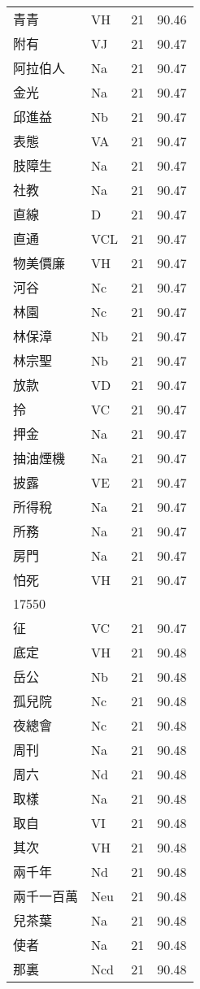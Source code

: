 \documentclass[twocolumn]{book}
\begin{document}
\begin{supertabular}{llrr}
青青 & VH & 21 &  90.46\\
附有 & VJ & 21 &  90.47\\
阿拉伯人 & Na & 21 &  90.47\\
金光 & Na & 21 &  90.47\\
邱進益 & Nb & 21 &  90.47\\
表態 & VA & 21 &  90.47\\
肢障生 & Na & 21 &  90.47\\
社教 & Na & 21 &  90.47\\
直線 & D & 21 &  90.47\\
直通 & VCL & 21 &  90.47\\
物美價廉 & VH & 21 &  90.47\\
河谷 & Nc & 21 &  90.47\\
林園 & Nc & 21 &  90.47\\
林保漳 & Nb & 21 &  90.47\\
林宗聖 & Nb & 21 &  90.47\\
放款 & VD & 21 &  90.47\\
拎 & VC & 21 &  90.47\\
押金 & Na & 21 &  90.47\\
抽油煙機 & Na & 21 &  90.47\\
披露 & VE & 21 &  90.47\\
所得稅 & Na & 21 &  90.47\\
所務 & Na & 21 &  90.47\\
房門 & Na & 21 &  90.47\\
怕死 & VH & 21 &  90.47\\
17550\\
征 & VC & 21 &  90.47\\
底定 & VH & 21 &  90.48\\
岳公 & Nb & 21 &  90.48\\
孤兒院 & Nc & 21 &  90.48\\
夜總會 & Nc & 21 &  90.48\\
周刊 & Na & 21 &  90.48\\
周六 & Nd & 21 &  90.48\\
取樣 & Na & 21 &  90.48\\
取自 & VI & 21 &  90.48\\
其次 & VH & 21 &  90.48\\
兩千年 & Nd & 21 &  90.48\\
兩千一百萬 & Neu & 21 &  90.48\\
兒茶葉 & Na & 21 &  90.48\\
使者 & Na & 21 &  90.48\\
那裏 & Ncd & 21 &  90.48\\

\end{supertabular}
\end{document}
